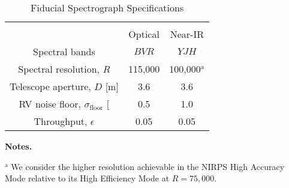 \begin{table*}
  \small
  \renewcommand{\arraystretch}{0.7}
  \caption{Fiducial Spectrograph Specifications}
  \label{RVFCtable:specrographs}
  \begin{tabular}{ccc}
    \hline \\ [-1ex]
    & Optical & Near-IR \\
    \hline
    Spectral bands & $BVR$ & $YJH$ \\
    Spectral resolution, $R$ & 115,000 & 100,000$^{\text{a}}$ \\
    Telescope aperture, $D$ [m] & 3.6 & 3.6 \\
    RV noise floor, $\sigma_{\text{floor}}$ [\mps{]} & 0.5 & 1.0 \\
    Throughput, $\epsilon$ & 0.05 & 0.05
  \end{tabular}
  \begin{list}{}{}
    \item {\bf{Notes.}}
    \item $^{\text{a}}$ We consider the higher resolution achievable in the NIRPS High Accuracy Mode relative to its High Efficiency Mode at $R = 75,000$.
  \end{list}
\end{table*}
